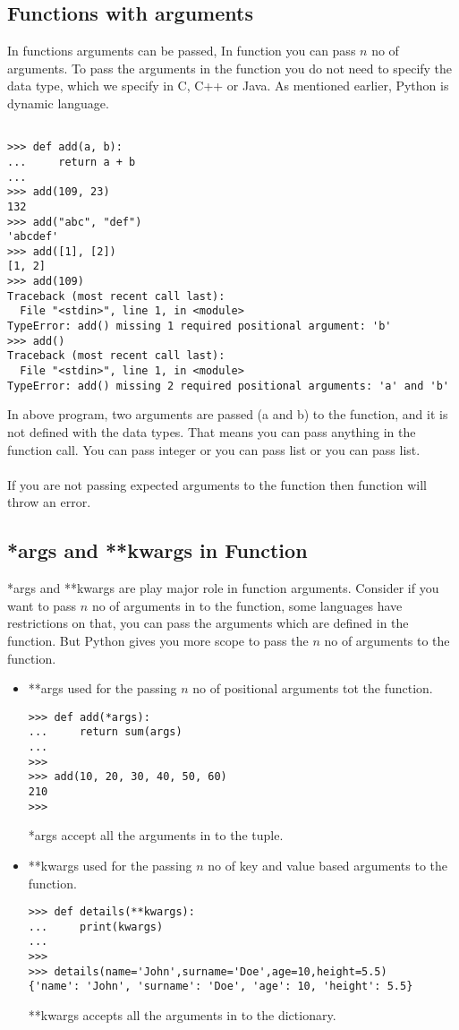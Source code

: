 \documentclass[letterpaper,12pt]{book}
\begin{document}
\subsection{Functions with arguments}
In functions arguments can be passed, In function you can pass $n$ no of arguments. To pass the arguments in the function you do not need to specify the data type, which we specify in C, C++ or Java. As mentioned earlier, Python is dynamic language. 
\begin{lstlisting}

>>> def add(a, b):
...     return a + b
... 
>>> add(109, 23)
132
>>> add("abc", "def")
'abcdef'
>>> add([1], [2])
[1, 2]
>>> add(109)
Traceback (most recent call last):
  File "<stdin>", line 1, in <module>
TypeError: add() missing 1 required positional argument: 'b'
>>> add()
Traceback (most recent call last):
  File "<stdin>", line 1, in <module>
TypeError: add() missing 2 required positional arguments: 'a' and 'b'
\end{lstlisting}
In above program, two arguments are passed (a and b) to the function, and it is not defined with the data types. That means you can pass anything in the function call. You can pass integer or you can pass list or you can pass list.
\paragraph{}
If you are not passing expected arguments to the function then function will throw an error.

\subsection{*args and **kwargs in Function}
*args and **kwargs are play major role in function arguments. Consider if you want to pass $n$ no of arguments in to the function, some languages have restrictions on that, you can pass the arguments which are defined in the function. But Python gives you more scope to pass the $n$ no of arguments to the function. 

\begin{itemize}
\item **args used for the passing $n$ no of positional arguments tot the function.
\begin{lstlisting}
>>> def add(*args):
...     return sum(args)
... 
>>> 
>>> add(10, 20, 30, 40, 50, 60)
210
>>> 
\end{lstlisting}
*args accept all the arguments in to the tuple.
\item **kwargs used for the passing $n$ no of key and value based arguments to the function.
\begin{lstlisting}
>>> def details(**kwargs):
...     print(kwargs)
... 
>>> 
>>> details(name='John',surname='Doe',age=10,height=5.5)
{'name': 'John', 'surname': 'Doe', 'age': 10, 'height': 5.5}
\end{lstlisting}
**kwargs accepts all the arguments in to the dictionary.
\end{itemize}
\end{document}
